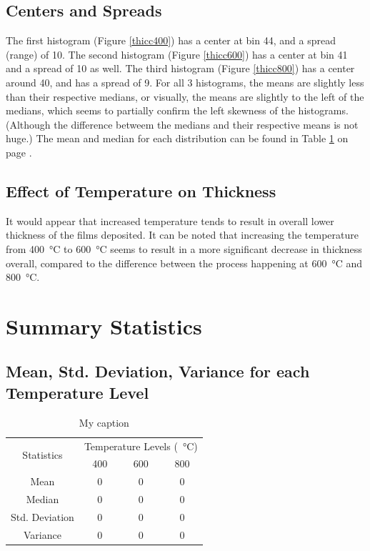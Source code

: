 \documentclass[letterpaper]{article}
\begin{document}
  \subsection{Centers and Spreads}
    The first histogram (Figure \ref{thicc400}) has a center at bin 44, and a spread (range) of 10.
    The second histogram (Figure \ref{thicc600}) has a center at bin 41 and a spread of 10 as well.
    The third histogram (Figure \ref{thicc800}) has a center around 40, and has a spread of 9.
    For all 3 histograms, the means are slightly less than their respective medians, or visually,
    the means are slightly to the left of the medians, which seems to partially confirm
    the left skewness of the histograms. (Although the difference betweem the medians and their
    respective means is not huge.) The mean and median for each distribution can be found in Table \ref{tempmean}
    on page \pageref{tempmean}.


  \subsection{Effect of Temperature on Thickness}
    It would appear that increased temperature tends to result in overall lower thickness
    of the films deposited. It can be noted that increasing the temperature from
    \SI{400}{\celsius} to \SI{600}{\celsius} seems to result in a more significant decrease
    in thickness overall, compared to the difference between the process happening at
    \SI{600}{\celsius} and \SI{800}{\celsius}.

\section{Summary Statistics}

  \subsection{Mean, Std. Deviation, Variance for each Temperature Level}

    \begin{table}[H]
    \centering
    \begin{tabular}{c|c|c|c|}
    \multirow{2}{*}{Statistics} & \multicolumn{3}{c|}{Temperature Levels (\SI{}{\celsius})} \\ \cline{2-4}
                                & 400           & 600          & 800          \\ \hline
    Mean                        & 0             & 0            & 0            \\ \hline
    Median                      & 0             & 0            & 0            \\ \hline
    Std. Deviation              & 0             & 0            & 0            \\ \hline
    Variance                    & 0             & 0            & 0            \\ \hline
    \end{tabular}
    \caption{My caption}
    \label{tempmean}
    \end{table}
\end{document}
